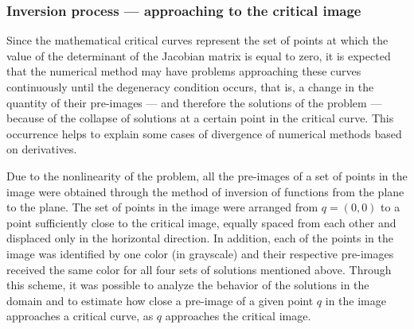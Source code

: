 \documentclass[journal=iecred,manuscript=article]{achemso}
\theoremstyle{definition}
\theoremstyle{remark}
\begin{document}
\subsubsection{Inversion process --- approaching to the critical image}

Since the mathematical critical curves represent the set of points at which the value of the determinant of the Jacobian matrix is equal to zero, it is expected that the numerical method may have problems approaching these curves continuously until the degeneracy condition occurs, that is, a change in the quantity of their pre-images --- and therefore the solutions of the problem --- because of the collapse of solutions at a certain point in the critical curve. This occurrence helps to explain some cases of divergence of numerical methods based on derivatives.

Due to the nonlinearity of the problem, all the pre-images of a set of points in the image were obtained through the method of inversion of functions from the plane to the plane. The set of points in the image were arranged from $ q = \left(0,0\right) $ to a point sufficiently close to the critical image, equally spaced from each other and displaced only in the horizontal direction. In addition, each of the points in the image was identified by one color (in grayscale) and their respective pre-images received the same color for all four sets of solutions mentioned above. Through this scheme, it was possible to analyze the behavior of the solutions in the domain and to estimate how close a pre-image of a given point $ q $ in the image approaches a critical curve, as $ q $ approaches the critical image.
\end{document}
